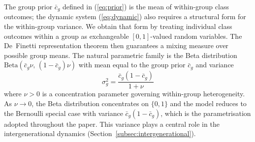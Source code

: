 \documentclass[12pt,a4paper]{article}
\theoremstyle{definition}
\numberwithin{proposition}{subsection}
\begin{document}
The group prior $\bar{c}_g$ defined in (\ref{eq:prior}) is the mean
of within-group class outcomes; the dynamic system
(\ref{eq:dynamic}) also requires a structural form for the
within-group variance. We obtain that form by treating individual
class outcomes within a group as exchangeable $[0,1]$-valued random
variables. The De~Finetti representation theorem
\citep{DeFinetti1964} then guarantees a mixing measure over possible
group means. The natural parametric family is the Beta distribution
$\mathrm{Beta}(\bar{c}_g \nu,\,(1 - \bar{c}_g)\nu)$ with mean equal
to the group prior $\bar{c}_g$ and variance
\begin{equation}
  \sigma_g^2 = \frac{\bar{c}_g(1 - \bar{c}_g)}{1 + \nu}
  \label{eq:beta-var}
\end{equation}
where $\nu > 0$ is a concentration parameter governing within-group
heterogeneity. As $\nu \to 0$, the Beta distribution concentrates
on $\{0,1\}$ and the model reduces to the Bernoulli special case
with variance $\bar{c}_g(1-\bar{c}_g)$, which is the parametrisation
adopted throughout the paper. This variance plays a central role in
the intergenerational dynamics
(Section~\ref{subsec:intergenerational}).




\end{document}
